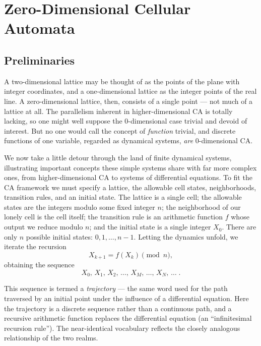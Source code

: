 \chapter{Zero-Dimensional Cellular Automata}

\section{Preliminaries}

A two-dimensional lattice may be thought of as the points of the plane
with integer coordinates, and a one-dimensional lattice as the integer
points of the real line.  A zero-dimensional lattice, then, consists of
a single point --- not much of a lattice at all.  The parallelism
inherent in higher-dimensional CA is totally lacking, so one might well
suppose the 0-dimensional case trivial and devoid of interest.  But no
one would call the concept of \emph{function} trivial, and discrete
functions of one variable, regarded as dynamical systems, \emph{are}
0-dimensional CA.

We now take a little detour through the land of finite dynamical
systems, illustrating important concepts these simple systems share
with far more complex ones, from higher-dimensional CA to systems of
differential equations.  To fit the CA framework we must specify a
lattice, the allowable cell states, neighborhoods, transition rules,
and an initial state.  The lattice is a single cell; the allowable
states are the integers modulo some fixed integer $n$; the neighborhood
of our lonely cell is the cell itself; the transition rule is an
arithmetic function $f$ whose output we reduce modulo $n$; and the
initial state is a single integer $X_0$.  There are only $n$ possible
initial states: $0,1,\dots,n-1$.  Letting the dynamics unfold, we
iterate the recursion
\begin{equation}
  X_{k+1} = f(X_k) \pmod n,
\end{equation}
obtaining the sequence
\[
  X_0,\, X_1,\, X_2,\, \dots,\, X_M,\, \dots,\, X_N,\, \dots\;.
\]

This sequence is termed a \emph{trajectory} --- the same word used for
the path traversed by an initial point under the influence of a
differential equation.  Here the trajectory is a discrete sequence
rather than a continuous path, and a recursive arithmetic function
replaces the differential equation (an ``infinitesimal recursion
rule'').  The near-identical vocabulary reflects the closely analogous
relationship of the two realms.

